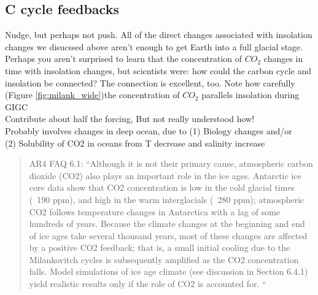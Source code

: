\documentclass[amstex,12pt]{book}
\begin{document}
\subsection{C cycle feedbacks}
Nudge, but perhaps not push. All of the direct changes associated with insolation changes we disucssed above aren't enough to get Earth into a full glacial stage. Perhaps you aren't surprised to learn that the concentration of $CO_2$ changes in time with insolation changes, but scientists were: how could the carbon cycle and insolation be connected? The connection is excellent, too. Note how carefully (Figure \ref{fig:milank_wide})the concentration of $CO_2$ parallels insolation during GIGC \\  
Contribute about half the forcing, But not really understood how!\\
Probably involves changes in deep ocean, due to (1) Biology changes and/or\\
(2) Solubility of CO2 in oceans from T decrease and salinity increase \\
\begin{quotation}
	AR4 FAQ 6.1: “Although it is not their primary cause, atmospheric carbon dioxide (CO2) also plays an important role in the ice ages. Antarctic ice core data show that CO2 concentration is low in the cold glacial times (~190 ppm), and high in the warm interglacials (~280 ppm); atmospheric CO2 follows temperature changes in Antarctica with a lag of some hundreds of years. Because the climate changes at the beginning and end of ice ages take several thousand years, most of these changes are affected by a positive CO2 feedback; that is, a small initial cooling due to the Milankovitch cycles is subsequently amplified as the CO2 concentration falls. Model simulations of ice age climate (see discussion in Section 6.4.1) yield realistic results only if the role of CO2 is accounted for. “
\end{quotation}
\end{document}
